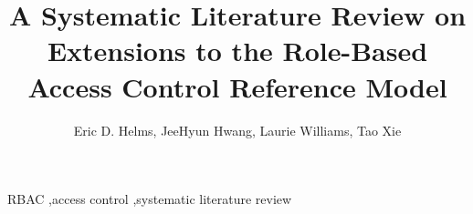 \documentclass[3p,12pt]{elsarticle}
\begin{document}
\begin{frontmatter}

\title{A Systematic Literature Review on Extensions to the Role-Based Access Control Reference Model}
	
\author{Eric D. Helms, JeeHyun Hwang, Laurie Williams, Tao Xie}
\address{North Carolina State University}
\address{Department of Computer Science}
\address{890 Oval Drive, Box 8206}
\address{Raleigh, NC 27695-2858}




\begin{keyword}
RBAC \sep access control \sep systematic literature review
\end{keyword}

\end{frontmatter}




		










\end{document}
